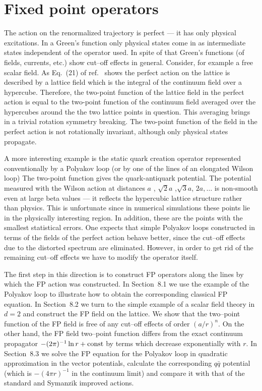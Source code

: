 \section{Fixed point operators}

The action on the renormalized trajectory is perfect ---
it has only physical excitations. In a Green's function
only physical states come in as intermediate states independent
of the operator used. In spite of that Green's functions
(of fields, currents, etc.) show cut--off effects in general.
Consider, for example a free scalar field. As Eq.~(21) 
of ref.~\cite{HN} shows the perfect action on the lattice is 
described by a lattice field which is the integral of the continuum
field over a hypercube.
Therefore, the two-point function of the lattice field in the perfect
action is equal to the two-point function of the continuum field averaged
over the hypercubes around the the two lattice points in question. This
averaging brings in a trivial rotation symmetry breaking. The two-point
function of the field in the perfect action is not rotationally invariant,
although   only physical states propagate.

  A more interesting example is the static quark creation operator
represented conventionally by a Polyakov loop (or by one of the lines of an
elongated Wilson loop) The two-point function gives the quark-antiquark
potential. The potential measured with the Wilson action at distances
$a$ , $\sqrt{2}a$ ,$\sqrt{3}a$, $2a, \dots$
is non-smooth even at large beta values --- it reflects the hypercubic 
lattice structure rather than physics.
This is unfortunate since in numerical simulations these points lie in
the physically interesting region.
In addition, these are the points with the smallest statistical errors.
One expects that simple Polyakov loops constructed in terms of the 
fields of the perfect action behave better, since the cut--off effects
due to the distorted spectrum are eliminated. However, in order to get
rid of
the remaining cut--off effects we have to modify the operator itself.

The first step in this direction is to construct FP operators
along the lines by which the FP action was constructed. In Section~8.1
we use the example of the Polyakov loop to illustrate how to obtain 
the corresponding classical FP equation. In Section~8.2 we turn to the 
simple example of a scalar field theory in $d=2$ and construct the FP
field on the lattice. We show that the two--point function of the
FP field is free of any cut--off effects of order $(a/r)^n$. 
On the other hand, the FP field two--point function differs from the 
exact continuum propagator $-(2\pi)^{-1} \ln r +{\rm const}$
by terms which decrease exponentially with $r$.
In Section~8.3 we solve the FP equation for the Polyakov loop in 
quadratic approximation in the vector potentials, calculate 
the corresponding $q \bar{q}$ potential 
(which is $-(4\pi r)^{-1}$ in the continuum limit) 
and compare it with that of the standard and Symanzik improved actions.

